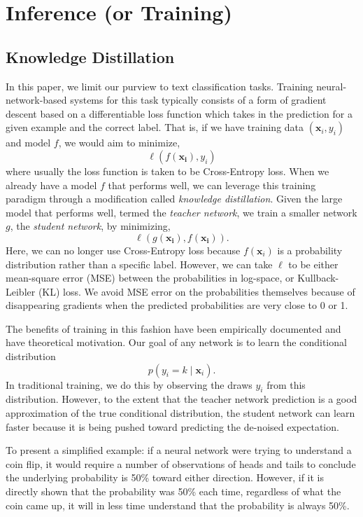 \documentclass[10pt]{article}
\begin{document}
\section{Inference (or Training)}
\label{sec:training}


\subsection{Knowledge Distillation}
\label{subsec:kd}

In this paper, we limit our purview to text classification tasks. Training
neural-network-based systems for this task typically consists of a form of
gradient descent based on a differentiable loss function which takes in the
prediction for a given example and the correct label. That is, if we have
training data $(\bm{x}_i, y_i)$ and model $f$, we would aim to minimize,
\[ \ell(f(\bm{x_i}), y_i)\]
where usually the loss function is taken to be Cross-Entropy loss. When we
already have a model $f$ that performs well, we can leverage this training
paradigm through a modification called \emph{knowledge distillation}. Given
the large model that performs well, termed the \emph{teacher network}, we
train a smaller network $g$, the \emph{student network}, by minimizing,
\[ \ell(g(\bm{x_i}), f(\bm{x_i})).\]
Here, we can no longer use Cross-Entropy loss because $f(\bm{x}_i)$ is a
probability distribution rather than a specific label. However, we can take
$\ell$ to be either mean-square error (MSE) between the probabilities in
log-space, or Kullback-Leibler (KL) loss. We avoid MSE error on the
probabilities themselves because of disappearing gradients when the predicted
probabilities are very close to 0 or 1.

The benefits of training in this fashion have been empirically documented
\citep{hinton2015distilling} and have theoretical motivation. Our goal of any
network is to learn the conditional distribution 
\[ p(y_i = k \mid \bm{x}_i).\]
In traditional training, we do this by observing the draws $y_i$ from this
distribution. However, to the extent that the teacher network prediction is a
good approximation of the true conditional distribution, the student network
can learn faster because it is being pushed toward predicting the de-noised
expectation.

To present a simplified example: if a neural network were trying to understand
a coin flip, it would require a number of observations of heads and tails to
conclude the underlying probability is 50\% toward either direction. However,
if it is directly shown that the probability was 50\% each time, regardless of
what the coin came up, it will in less time understand that the probability is
always 50\%.
\end{document}
